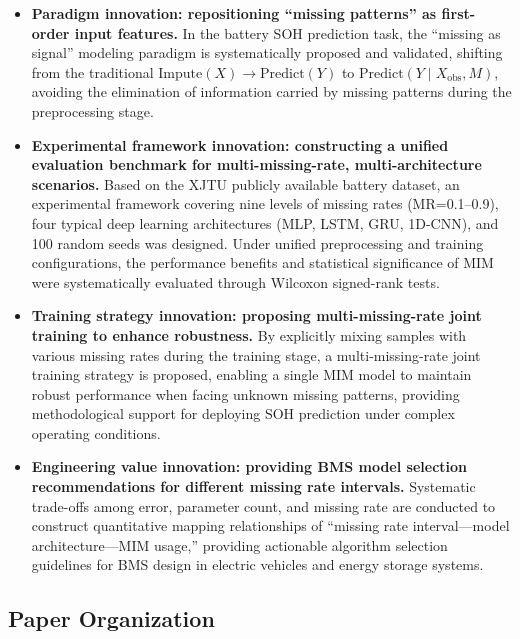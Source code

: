 \documentclass[5p,times]{elsarticle}
\begin{document}
\begin{itemize}
  \item \textbf{Paradigm innovation: repositioning ``missing patterns'' as first-order input features.} In the battery SOH prediction task, the ``missing as signal'' modeling paradigm is systematically proposed and validated, shifting from the traditional $\text{Impute}(X)\rightarrow\text{Predict}(Y)$ to $\text{Predict}(Y \mid X_{\mathrm{obs}}, M)$, avoiding the elimination of information carried by missing patterns during the preprocessing stage.

  \item \textbf{Experimental framework innovation: constructing a unified evaluation benchmark for multi-missing-rate, multi-architecture scenarios.} Based on the XJTU publicly available battery dataset, an experimental framework covering nine levels of missing rates (MR=0.1--0.9), four typical deep learning architectures (MLP, LSTM, GRU, 1D-CNN), and 100 random seeds was designed. Under unified preprocessing and training configurations, the performance benefits and statistical significance of MIM were systematically evaluated through Wilcoxon signed-rank tests.

  \item \textbf{Training strategy innovation: proposing multi-missing-rate joint training to enhance robustness.} By explicitly mixing samples with various missing rates during the training stage, a multi-missing-rate joint training strategy is proposed, enabling a single MIM model to maintain robust performance when facing unknown missing patterns, providing methodological support for deploying SOH prediction under complex operating conditions.

  \item \textbf{Engineering value innovation: providing BMS model selection recommendations for different missing rate intervals.} Systematic trade-offs among error, parameter count, and missing rate are conducted to construct quantitative mapping relationships of ``missing rate interval---model architecture---MIM usage,'' providing actionable algorithm selection guidelines for BMS design in electric vehicles and energy storage systems.
\end{itemize}

\subsection{Paper Organization}
\end{document}
